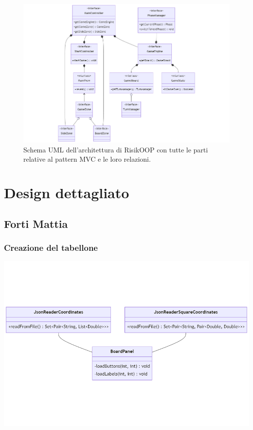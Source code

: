 \documentclass[a4paper,12pt]{report}
\begin{document}
%
\begin{figure}[H]
\centering{}
\includegraphics[width=\textwidth]{img/Detail-Model.png}
\caption{Schema UML dell'architettura di RisikOOP con tutte le parti relative al pattern MVC e le loro relazioni.}
\label{Design}
\end{figure}
%
\section{Design dettagliato}
%
\subsection{Forti Mattia}
%
\subsubsection*{Creazione del tabellone}
%
\includegraphics[width=\textwidth]{img/Board-Json.png}
%
\end{document}
